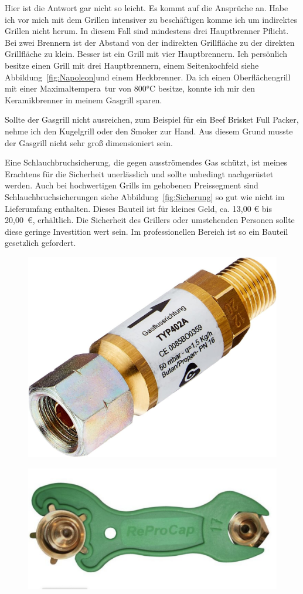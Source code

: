 	Hier ist die 
	Antwort gar nicht so leicht. 
	Es kommt auf die Ansprüche an. Habe ich 
	vor mich mit dem Grillen intensiver zu beschäftigen komme ich um indirektes 
	Grillen nicht herum. In diesem Fall sind 
	mindestens drei Hauptbrenner 
	Pflicht.  Bei zwei Brennern ist der Abstand von der indirekten Grillfläche zu der 
	direkten Grillfläche zu klein. Besser ist ein Grill 
	mit vier 
	Hauptbrennern. Ich persönlich besitze einen Grill mit drei Hauptbrennern, 
	einem Seitenkochfeld siehe Abbildung~\vref{fig:Napoleon}und einem Heckbrenner. Da 
	ich einen 
	Oberflächengrill mit einer Maximaltempera~tur von 800°C besitze, konnte ich 
	mir den Keramikbrenner in meinem Gasgrill 
	sparen. 
	
	Sollte der Gasgrill nicht ausreichen, zum Beispiel für ein Beef Brisket Full 
	Packer, nehme ich den Kugelgrill oder den Smoker 
	zur Hand. Aus diesem 
	Grund musste der Gasgrill nicht sehr groß dimensioniert sein. 
	
	Eine Schlauchbruchsicherung, die gegen ausströmendes Gas schützt, ist 
	meines Erachtens für die Sicherheit unerlässlich 
	und sollte unbedingt nachgerüstet 
	werden. 
	Auch bei hochwertigen Grills im gehobenen Preissegment sind 
	Schlauchbruchsicherungen siehe 
	Abbildung~\vref{fig:Sicherung} so gut wie nicht im 
	Lieferumfang enthalten. Dieses Bauteil ist für kleines Geld, ca. 13,00 € bis 
	20,00~€, erhältlich. Die Sicherheit des Grillers 
	oder umstehenden 
	Personen sollte diese geringe Investition wert sein. Im 
	professionellen Bereich ist so ein Bauteil gesetzlich gefordert.

\begin{figure}[htbp]
	\centering
	\begin{minipage}{.5\textwidth}
		\centering
		\includegraphics[width=.5\linewidth]{pics/Schlauchbruchsicherung}
		\label{fig:Sicherung}
	\end{minipage}%
	\begin{minipage}{.5\textwidth}
		\centering
		\includegraphics[width=.5\linewidth]{pics/Schlüssel}
		\label{fig:Schlüssel}
	\end{minipage}%
\end{figure}

